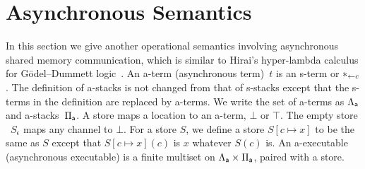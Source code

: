 \documentclass[envcountsame]{llncs}
\begin{document}

\section{Asynchronous Semantics}
\label{sec:async}

In this section we give another operational semantics involving
asynchronous shared memory communication, which is similar to Hirai's
hyper-lambda calculus for G\"odel--Dummett logic~\citep{hiraiflops2012}.
An a-term (asynchronous term)~$t$ is an s-term or
$\ast_{\leftarrow{c}}$.
The definition of a-stacks is not changed from that of s-stacks except
that the s-terms in the definition are replaced by a-terms.
We write the set of a-terms as $\Lambda_{\mathsf a}$ and a-stacks~$\Pi_{\mathsf a}$.
A store maps a location to an a-term, $\bot$ or $\top$.
The empty store%
~$S_\epsilon$ maps any channel to $\bot$.
For a store $S$, we define a store $S[c\mapsto x]$ to be
the same as $S$ except that $S[c\mapsto x](c)$ is $x$ whatever $S(c)$ is.
An a-executable (asynchronous executable)
is a finite multiset on $\Lambda_{\mathsf a} \times \Pi_{\mathsf a}$,
paired with a store.
\end{document}
